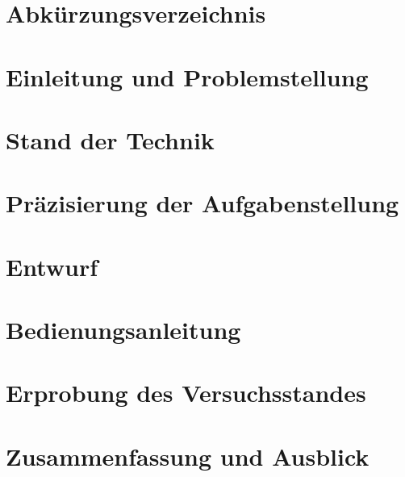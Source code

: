\documentclass[german,
beleg,
lot,
lof,
notitlepage,
utf8,
hyperref,
bibnum
]{zihpub}
\begin{document}

\chapter*{Abkürzungsverzeichnis}



\chapter{Einleitung und Problemstellung}



\chapter{Stand der Technik}


\chapter{Präzisierung der Aufgabenstellung}



\chapter{Entwurf}


\chapter{Bedienungsanleitung}


\chapter{Erprobung des Versuchsstandes}



\chapter{Zusammenfassung und Ausblick}








    
    
\end{document}
